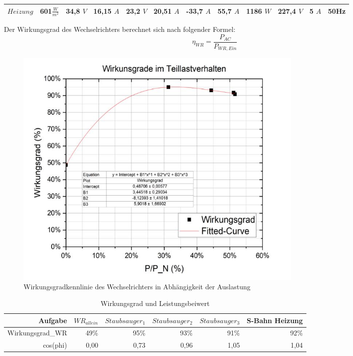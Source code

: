\begin{table}[!ht]
\begin{tabularx}{\linewidth}{|l|l|X|X|X|X|X|X|X|X|X|X|}
\rowcolor[HTML]{FFFFFF} 
\cellcolor[HTML]{CFE5A8}$Heizung$ & 601$\frac{W}{m^2}$                                                        & 34,8   $V$                       & 16,15 $A$                        & 23,2                        $V$ & 20,51 $A$                        & -33,7 $A$                          & 55,7                        $A$ & 1186 $W$                        & 227,4 $V$                       & 5                           $A$ & 50Hz                    \\ \hline
\end{tabularx}
	\label{tab:230512_Messtabelle}
\end{table}

Der Wirkungsgrad des Wechselrichters berechnet sich nach folgender Formel:
%
\begin{equation}
	\eta_{ WR} = \frac{ P_{AC} }{ P_{WR,Ein} }
	\label{eq:230509_Wirkungsgrad}
\end{equation}
%
%
\begin{figure}[!ht]
		\centering
		\includegraphics[width=0.7\textwidth]{Abbildungen/Kennlinie wr}
		\caption{Wirkungsgradkennlinie des Wechselrichters in Abhängigkeit der Auslastung}
		\label{fig:230512_WRkennlinie}
\end{figure}
%
\begin{table}[]
 \caption{Wirkungsgrad und Leistungsbeiwert}
	\centering
\begin{tabular}{|r|r|r|r|r|r|}
\hline
\rowcolor[HTML]{76B900} 
Aufgabe                                  & $WR_{allein}$ & $Staubsauger_1$ & $Staubsauger_2$ & $Staubsauger_3$ & S-Bahn Heizung \\ \hline
\cellcolor[HTML]{cfe5a8}Wirkungsgrad\_WR & 49\%       & 95\%     & 93\%     & 91\%     & 92\%            \\ \hline
\cellcolor[HTML]{cfe5a8}cos(phi)         & 0,00       & 0,73     & 0,96     & 1,05     & 1,04            \\ \hline
\end{tabular}
\end{table}
